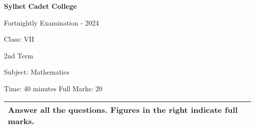 \documentclass[10pt]{article}
\begin{document}
\vspace{0.5in}



\begin{center}
  \bfseries\large
  Sylhet Cadet College

\normalsize
Fortnightly Examination - 2024

  Class: VII
  
  2nd Term

  Subject: Mathematics

  Time: 40 minutes \qquad \qquad  \qquad \qquad \qquad  \qquad \qquad  \qquad Full Marks: 20

\end{center}

\noindent
\begin{tabular}{p{\dimexpr\linewidth-2\tabcolsep}}
  \textbf{Answer all the questions. Figures in the right indicate full marks.}\\
  \hline
\end{tabular}
\end{document}
